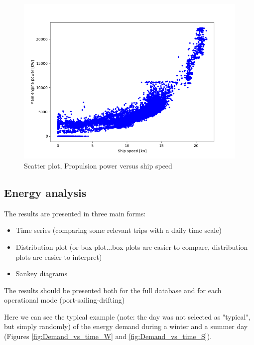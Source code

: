 \documentclass[preprint,12pt]{elsarticle}
\begin{document}
\begin{figure}
	\centering
	\includegraphics[width=0.9\linewidth]{Figures/Pme_vs_vship}
	\caption{Scatter plot, Propulsion power versus ship speed}
	\label{fig:Pme_vs_vship}
\end{figure}



\subsection{Energy analysis} \label{sec:res:energy}

The results are presented in three main forms:
\begin{itemize}
	\item Time series (comparing some relevant trips with a daily time scale)
	\item Distribution plot (or box plot...box plots are easier to compare, distribution plots are easier to interpret)
	\item Sankey diagrams
\end{itemize}

The results should be presented both for the full database and for each operational mode (port-sailing-drifting)

Here we can see the typical example (note: the day was not selected as "typical", but simply randomly) of the energy demand during a winter and a summer day (Figures \ref{fig:Demand_vs_time_W} and \ref{fig:Demand_vs_time_S}). 
\end{document}
